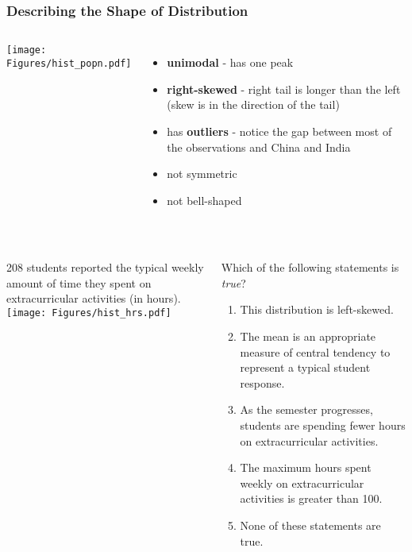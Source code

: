 \begin{frame}
\frametitle{Describing the Shape of Distribution}
\begin{columns}
\texttt{[image: Figures/hist\_popn.pdf]}
\begin{itemize}
    \item
    \textbf{unimodal} - has one peak
    \item
    \textbf{right-skewed} - right tail is longer than the left (skew is in the direction of the tail)
    \item
    has \textbf{outliers} - notice the gap between most of the observations and China and India
    \item
    not symmetric
    \item
    not bell-shaped
\end{itemize}
\end{columns}
\end{frame}

\begin{frame}
\frametitle{\grp}
\begin{columns}
208 students reported the typical weekly amount of time they spent on extracurricular activities (in hours).  \\
\texttt{[image: Figures/hist\_hrs.pdf]}
\begin{clicker}{Which of the following statements is \emph{true}?}
\begin{enumerate}
    \item
    This distribution is left-skewed.
    \item
    The mean is an appropriate measure of central tendency to represent a typical student response.
    \item
    As the semester progresses, students are spending fewer hours on extracurricular activities.
    \item
    The maximum hours spent weekly on extracurricular activities is greater than 100.
    \item
    None of these statements are true.
\end{enumerate}
\end{clicker}
\end{columns}
\end{frame}

